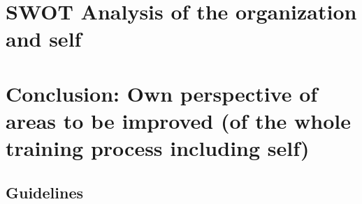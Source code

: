 \documentclass[a4paper,12pt]{report}%
\begin{document}
\chapter{SWOT Analysis of the organization and self}

\chapter{Conclusion: Own perspective of areas to be improved (of the whole training process including self)}


\begin{appendices}
	\chapter{Guidelines}
\end{appendices}




\end{document}

